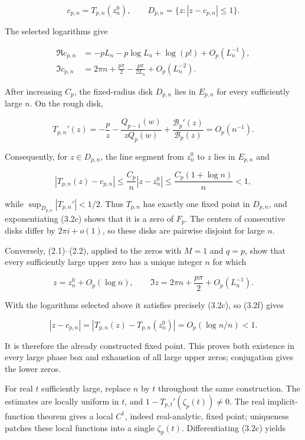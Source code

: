 \[
 c_{p,n}=T_{p,n}(z_n^0),\qquad
 D_{p,n}=\{z:|z-c_{p,n}|\leq1\}.
\tag{Inv-3.2d}
\]

The selected logarithms give

\[
 \begin{aligned}
 \Re c_{p,n}
 &=-pL_n-p\log L_n+\log(p!)+O_p(L_n^{-1}),\\
 \Im c_{p,n}
 &=2\pi n+\frac{p\pi}{2}
   -\frac{p\pi}{2L_n}+O_p(L_n^{-2}).
 \end{aligned}
\tag{Inv-3.2e}
\]

After increasing \(C_p\), the fixed-radius disk \(D_{p,n}\) lies in
\(E_{p,n}\) for every sufficiently large \(n\). On the rough disk,

\[
 T_{p,n}'(z)=-\frac pz
 -\frac{Q_{p-1}(w)}{zQ_p(w)}
 +\frac{\mathcal B_p'(z)}{\mathcal B_p(z)}
 =O_p(n^{-1}).
\tag{Inv-3.2f}
\]

Consequently, for \(z\in D_{p,n}\), the line segment from \(z_n^0\) to
\(z\) lies in \(E_{p,n}\) and

\[
 |T_{p,n}(z)-c_{p,n}|
 \leq \frac{C_p}{n}|z-z_n^0|
 \leq \frac{C_p(1+\log n)}n<1,
\]

while \(\sup_{D_{p,n}}|T_{p,n}'|<1/2\). Thus \(T_{p,n}\) has exactly one
fixed point in \(D_{p,n}\), and exponentiating (3.2c) shows that it is a
zero of \(F_p\). The centers of consecutive disks differ by
\(2\pi i+o(1)\), so these disks are pairwise disjoint for large \(n\).

Conversely, (2.1)--(2.2), applied to the zeros with \(M=1\) and \(q=p\),
show that every
sufficiently large upper zero has a unique integer \(n\) for which

\[
 z=z_n^0+O_p(\log n),\qquad
 \Im z=2\pi n+\frac{p\pi}{2}+O_p(L_n^{-1}).
\]

With the logarithms selected above it satisfies precisely (3.2c), so (3.2f)
gives

\[
 |z-c_{p,n}|=|T_{p,n}(z)-T_{p,n}(z_n^0)|
 =O_p(\log n/n)<1.
\]

It is therefore the already constructed fixed point. This proves both
existence in every large phase box and exhaustion of all large upper zeros;
conjugation gives the lower zeros.

For real \(t\) sufficiently large, replace \(n\) by \(t\) throughout the
same construction. The estimates are locally uniform in \(t\), and
\(1-T_{p,t}'(\zeta_p(t))\ne0\). The real implicit-function theorem gives a
local \(C^1\), indeed real-analytic, fixed point; uniqueness patches these
local functions into a single \(\zeta_p(t)\). Differentiating (3.2c) yields

